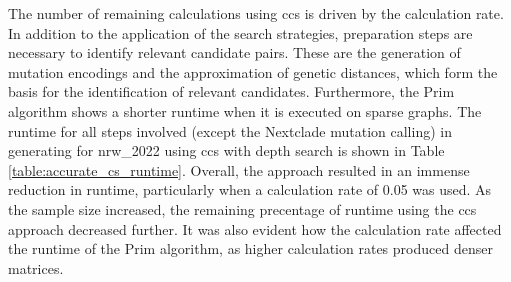 The number of remaining calculations using \acrshort{ccs} is driven by the calculation rate. In addition to the application of the search strategies, preparation steps are necessary to identify relevant candidate pairs. These are the generation of mutation encodings and the approximation of genetic distances, which form the basis for the identification of relevant candidates. Furthermore, the Prim algorithm shows a shorter runtime when it is executed on sparse graphs. The runtime for all steps involved (except the Nextclade mutation calling) in generating  for nrw\_2022 using \acrshort{ccs} with depth search is shown in Table \ref{table:accurate_cs_runtime}. Overall, the approach resulted in an immense reduction in runtime, particularly when a calculation rate of 0.05 was used. As the sample size increased, the remaining precentage of runtime using the \acrshort{ccs} approach decreased further. It was also evident how the calculation rate affected the runtime of the Prim algorithm, as higher calculation rates produced denser matrices.

